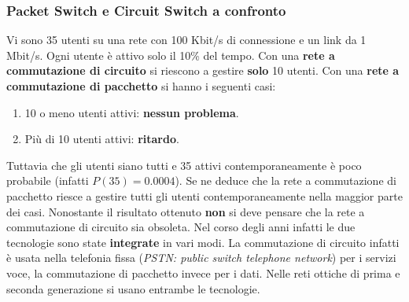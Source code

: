 \documentclass[11pt,a4paper,oneside]{book}
\theoremstyle{definition}
\begin{document}
\subsubsection{Packet Switch e Circuit Switch a confronto}
Vi sono 35 utenti su una rete con 100 Kbit/s di connessione e un link da 1 Mbit/s.
Ogni utente è attivo solo il 10\% del tempo. Con una \textbf{rete a commutazione di circuito} si riescono a gestire \textbf{solo} 10 utenti. Con una \textbf{rete a commutazione di pacchetto} si hanno i seguenti casi:
\begin{enumerate}
	\item 10 o meno utenti attivi: \textbf{nessun problema}.
	\item Più di 10 utenti attivi: \textbf{ritardo}.
\end{enumerate}
Tuttavia che gli utenti siano tutti e 35 attivi contemporaneamente è poco probabile (infatti $P(35) = 0.0004$).
Se ne deduce che la rete a commutazione di pacchetto riesce a gestire tutti gli utenti contemporaneamente nella maggior parte dei casi.
Nonostante il risultato ottenuto \textbf{non} si deve pensare che la rete a  commutazione di circuito sia obsoleta. Nel corso degli anni infatti le due tecnologie sono state \textbf{integrate} in vari modi. La commutazione di circuito infatti è usata nella telefonia fissa (\textit{PSTN: public switch telephone network}) per i servizi voce, la commutazione di pacchetto invece per i dati. Nelle reti ottiche di prima e seconda generazione si usano entrambe le tecnologie.

\pagebreak
\end{document}
